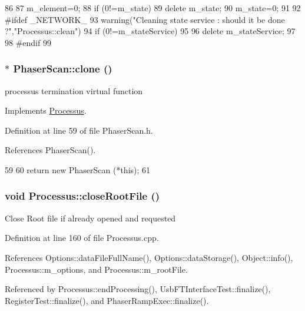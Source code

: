 \begin{DoxyCode}
86   {
87     m_element=0;
88     if (0!=m_state) {
89       delete m_state;
90       m_state=0;
91     }
92 #ifdef _NETWORK_
93     warning("Cleaning state service : should it be done ?","Processus::clean")
94       if (0!=m_stateService)
95       {
96         delete m_stateService;
97       }
98 #endif
99   }
\end{DoxyCode}
\hypertarget{classPhaserScan_a4c842f4bda17fb8907c51efc0ccb9d43}{
\subsubsection[{clone}]{$\ast$ PhaserScan::clone ()}}
\label{classPhaserScan_a4c842f4bda17fb8907c51efc0ccb9d43}
processus termination virtual function 

Implements \hyperlink{classProcessus_aca8856f6d6d7b7e1fe941f298dcbb502}{Processus}.

Definition at line 59 of file PhaserScan.h.

References PhaserScan().


\begin{DoxyCode}
59                      {
60     return new PhaserScan (*this);
61   }
\end{DoxyCode}
\hypertarget{classProcessus_a2f3c41e99da4c738ea3d8f7b0d20a665}{
\subsubsection[{closeRootFile}]{\setlength{\rightskip}{0pt plus 5cm}void Processus::closeRootFile ()}}
\label{classProcessus_a2f3c41e99da4c738ea3d8f7b0d20a665}
Close Root file if already opened and requested 

Definition at line 160 of file Processus.cpp.

References Options::dataFileFullName(), Options::dataStorage(), Object::info(), Processus::m\_\-options, and Processus::m\_\-rootFile.

Referenced by Processus::endProcessing(), UsbFTInterfaceTest::finalize(), RegisterTest::finalize(), and PhaserRampExec::finalize().



